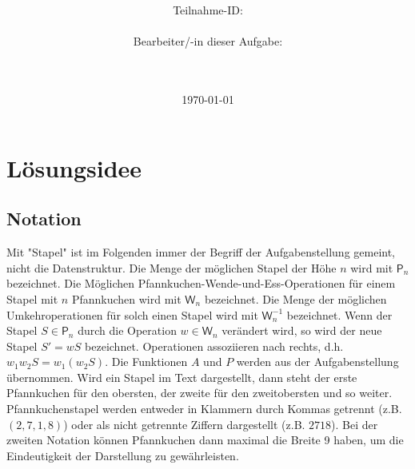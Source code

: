 \documentclass[a4paper,10pt,ngerman]{scrartcl}
\title{\textbf{\Huge\Aufgabe}}
\author{\LARGE Teilnahme-ID: \LARGE \TeilnahmeId \\\\
  \LARGE Bearbeiter/-in dieser Aufgabe: \\
  \LARGE \Name\\\\}
\date{\LARGE\today}
\begin{document}
\maketitle
\tableofcontents

\vspace{0.5cm}

\section{Lösungsidee}
\subsection{Notation}
Mit "Stapel" ist im Folgenden immer der Begriff der Aufgabenstellung gemeint,
nicht die Datenstruktur. Die Menge der möglichen Stapel der Höhe $n$ wird mit
$\mathsf{P}_n$ bezeichnet. Die Möglichen Pfannkuchen-Wende-und-Ess-Operationen
für einem Stapel mit $n$ Pfannkuchen wird mit $\mathsf{W}_n$ bezeichnet. Die
Menge der möglichen Umkehroperationen für solch einen Stapel wird mit
$\mathsf{W}^{-1}_n$ bezeichnet. Wenn der Stapel $S \in \mathsf{P}_n$ durch die
Operation $w \in \mathsf{W}_n$ verändert wird, so wird der neue Stapel $S' = w
  S$ bezeichnet. Operationen assoziieren nach rechts, d.h. $w_1 w_2 S = w_1 (w_2
  S)$. Die Funktionen $A$ und $P$ werden aus der Aufgabenstellung übernommen.
Wird ein Stapel im Text dargestellt, dann steht der erste Pfannkuchen für den
obersten, der zweite für den zweitobersten und so weiter. Pfannkuchenstapel
werden entweder in Klammern durch Kommas getrennt (z.B. $(2,7,1,8)$) oder als
nicht getrennte Ziffern dargestellt (z.B. $2718$). Bei der zweiten Notation
können Pfannkuchen dann maximal die Breite 9 haben, um die Eindeutigkeit der
Darstellung zu gewährleisten.
\end{document}
